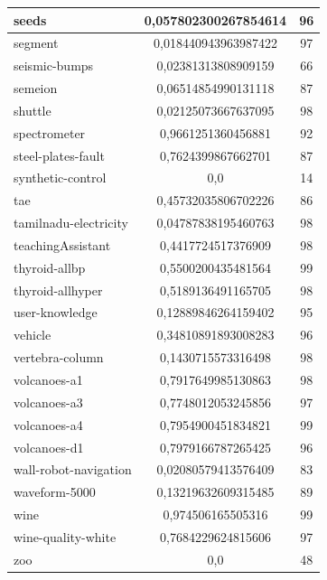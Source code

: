 \documentclass[times,specification,annotation]{itmo-student-thesis}
\begin{document}
\begin{center}
\begin{longtable}{ |m{5cm}|c|c| }
		\hline
		seeds & 0,057802300267854614 & 96 \\
		\hline
		segment & 0,018440943963987422 & 97 \\
		\hline
		seismic-bumps & 0,02381313808909159 & 66 \\
		\hline
		semeion & 0,06514854990131118 & 87 \\
		\hline
		shuttle & 0,02125073667637095 & 98 \\
		\hline
		spectrometer & 0,9661251360456881 & 92 \\
		\hline
		steel-plates-fault & 0,7624399867662701 & 87 \\
		\hline
		synthetic-control & 0,0 & 14 \\
		\hline
		tae & 0,45732035806702226 & 86 \\
		\hline
		tamilnadu-electricity & 0,04787838195460763 & 98 \\
		\hline
		teachingAssistant & 0,4417724517376909 & 98 \\
		\hline
		thyroid-allbp & 0,5500200435481564 & 99 \\
		\hline
		thyroid-allhyper & 0,5189136491165705 & 98 \\
		\hline
		user-knowledge & 0,12889846264159402 & 95 \\
		\hline
		vehicle & 0,34810891893008283 & 96 \\
		\hline
		vertebra-column & 0,1430715573316498 & 98 \\
		\hline
		volcanoes-a1 & 0,7917649985130863 & 98 \\
		\hline
		volcanoes-a3 & 0,7748012053245856 & 97 \\
		\hline
		volcanoes-a4 & 0,7954900451834821 & 99 \\
		\hline
		volcanoes-d1 & 0,7979166787265425 & 96 \\
		\hline
		wall-robot-navigation & 0,02080579413576409 & 83 \\
		\hline
		waveform-5000 & 0,13219632609315485 & 89 \\
		\hline
		wine & 0,974506165505316 & 99 \\
		\hline
		wine-quality-white & 0,7684229624815606 & 97 \\
		\hline
		zoo & 0,0 & 48 \\
		\hline
	\end{longtable}
\end{center}
\end{document}
